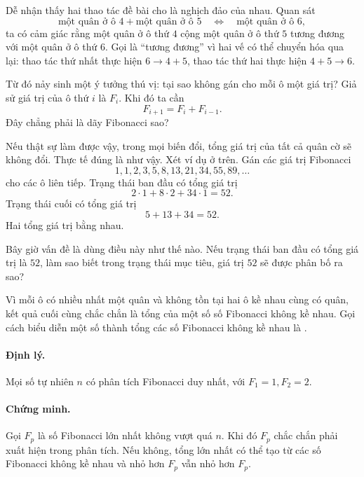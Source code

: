 \documentclass[11pt]{article}
\begin{document}
Dễ nhận thấy hai thao tác đề bài cho là nghịch đảo của nhau. Quan sát
\[
  \text{một quân ở ô }4 + \text{một quân ở ô }5
  \quad\Longleftrightarrow\quad
  \text{một quân ở ô }6,
\]
ta có cảm giác rằng một quân ở ô thứ \(4\) cộng một quân ở ô thứ \(5\) tương
đương với một quân ở ô thứ \(6\). Gọi là ``tương đương'' vì hai vế có thể
chuyển hóa qua lại: thao tác thứ nhất thực hiện \(6\to4+5\), thao tác thứ hai
thực hiện \(4+5\to6\).

Từ đó nảy sinh một ý tưởng thú vị: tại sao không gán cho mỗi ô một giá trị?
Giả sử giá trị của ô thứ \(i\) là \(F_i\). Khi đó ta cần
\[
  F_{i+1}=F_i+F_{i-1}.
\]
Đây chẳng phải là dãy Fibonacci sao?

Nếu thật sự làm được vậy, trong mọi biến đổi, tổng giá trị của tất cả quân cờ
sẽ không đổi. Thực tế đúng là như vậy. Xét ví dụ ở trên. Gán các giá trị
Fibonacci
\[
  1,1,2,3,5,8,13,21,34,55,89,\ldots
\]
cho các ô liên tiếp. Trạng thái ban đầu có tổng giá trị
\[
  2\cdot 1+8\cdot 2+34\cdot 1=52.
\]
Trạng thái cuối có tổng giá trị
\[
  5+13+34=52.
\]
Hai tổng giá trị bằng nhau.

Bây giờ vấn đề là dùng điều này như thế nào. Nếu trạng thái ban đầu có tổng
giá trị là \(52\), làm sao biết trong trạng thái mục tiêu, giá trị \(52\) sẽ
được phân bố ra sao?

Vì mỗi ô có nhiều nhất một quân và không tồn tại hai ô kề nhau cùng có quân,
kết quả cuối cùng chắc chắn là tổng của một số số Fibonacci không kề nhau.
Gọi cách biểu diễn một số thành tổng các số Fibonacci không kề nhau là
.

\paragraph{Định lý.}
Mọi số tự nhiên \(n\) có phân tích Fibonacci duy nhất, với \(F_1=1,F_2=2\).

\paragraph{Chứng minh.}
Gọi \(F_p\) là số Fibonacci lớn nhất không vượt quá \(n\). Khi đó \(F_p\) chắc
chắn phải xuất hiện trong phân tích. Nếu không, tổng lớn nhất có thể tạo từ
các số Fibonacci không kề nhau và nhỏ hơn \(F_p\) vẫn nhỏ hơn \(F_p\).
\end{document}

